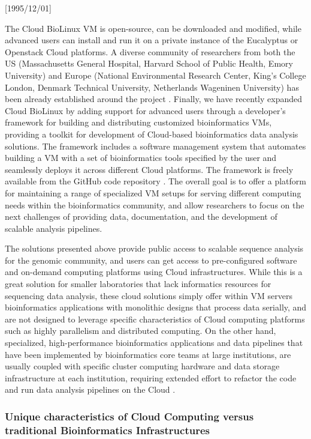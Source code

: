 \NeedsTeXFormat{LaTeX2e}[1995/12/01] \documentclass[10pt]{bmc_article}
\newenvironment{bmcformat}{\begin{raggedright}\baselineskip20pt\sloppy\setboolean{publ}{false}}{\end{raggedright}\baselineskip20pt\sloppy}
\begin{document}
\begin{bmcformat}
The Cloud BioLinux VM is open-source, can be downloaded and modified, while advanced users can install and 
run it on a private instance of the Eucalyptus \cite{euca} or Openstack \cite{openstack} Cloud platforms. 
A diverse community of researchers from both the US
(Massachusetts General Hospital, Harvard School of Public Health, Emory University) and Europe (National
Environmental Research Center, King's College London, Denmark Technical University, Netherlands Wageninen
University) has been already established around the project \cite{googlegroup}. Finally, we have recently 
expanded Cloud BioLinux by adding support for advanced users through a developer's framework for building 
and distributing customized bioinformatics VMs, providing a toolkit for development of Cloud-based 
bioinformatics data analysis solutions. The framework includes a software management system that automates 
building a VM with a set of bioinformatics tools specified by the user and seamlessly deploys it across different
Cloud platforms. The framework is freely available from the GitHub code repository \cite{fabric}.  The overall goal is
to offer a platform for maintaining a range of specialized VM setups for serving different computing needs
within the bioinformatics community, and allow researchers to focus on the next challenges of providing data,
documentation, and the development of scalable analysis pipelines. 

The solutions presented above provide public access to scalable sequence analysis for the genomic community, 
and users can get access to pre-configured software and on-demand computing platforms using Cloud infrastructures.
While this is a great solution for smaller laboratories that lack informatics resources for sequencing data analysis,   
these cloud solutions simply offer within VM servers bioinformatics applications with monolithic designs that 
process data serially, and are not designed to leverage specific characteristics of Cloud computing platforms
such as highly parallelism and distributed computing.  On the other hand, specialized, high-performance bioinformatics 
applications and data pipelines that have been implemented by bioinformatics core teams at large institutions,
are usually coupled with specific cluster computing hardware and data storage infrastructure at each institution, 
requiring extended effort to refactor the code and run data analysis pipelines on the Cloud \cite{Wilkening2009}.


\subsubsection*{Unique characteristics of Cloud Computing versus traditional Bioinformatics Infrastructures}


\end{bmcformat}
\end{document}
